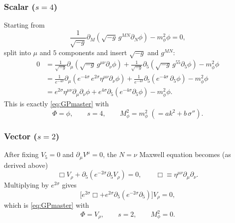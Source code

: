 \documentclass[11pt]{article}
\begin{document}
\subsubsection*{Scalar ($s=4$)}
Starting from
\[
\frac{1}{\sqrt{-g}}\partial_M\!\left(\sqrt{-g}\,g^{MN}\partial_N\phi\right)-m_\phi^2\phi=0,
\]
split into $\mu$ and $5$ components and insert $\sqrt{-g}$ and $g^{MN}$:
\begin{align}
0
&= \frac{1}{\sqrt{-g}}\partial_\mu\!\left(\sqrt{-g}\,g^{\mu\nu}\partial_\nu\phi\right)
+ \frac{1}{\sqrt{-g}}\partial_5\!\left(\sqrt{-g}\,g^{55}\partial_5\phi\right)
- m_\phi^2\phi \nonumber\\
&= \frac{1}{e^{-4\sigma}}\partial_\mu\!\left(e^{-4\sigma}\,e^{2\sigma}\eta^{\mu\nu}\partial_\nu\phi\right)
+ \frac{1}{e^{-4\sigma}}\partial_5\!\left(e^{-4\sigma}\,\partial_5\phi\right)
- m_\phi^2\phi \nonumber\\
&= e^{2\sigma}\eta^{\mu\nu}\partial_\mu\partial_\nu\phi
+ e^{4\sigma}\partial_5\!\left(e^{-4\sigma}\partial_5\phi\right)
- m_\phi^2\phi .
\end{align}
This is exactly \eqref{eq:GPmaster} with
\[
\Phi=\phi,\qquad s=4,\qquad M_\phi^2=m_\phi^2 \;(= ak^2+b\,\sigma'').
\]

\subsubsection*{Vector ($s=2$)}
After fixing $V_5=0$ and $\partial_\mu V^\mu=0$, the $N=\nu$ Maxwell equation becomes (as derived above)
\[
\Box V_\rho + \partial_5\!\left(e^{-2\sigma}\partial_5 V_\rho\right)=0,
\qquad \Box \equiv \eta^{\mu\nu}\partial_\mu\partial_\nu.
\]
Multiplying by $e^{2\sigma}$ gives
\[
\Big[e^{2\sigma}\Box + e^{2\sigma}\partial_5\!\left(e^{-2\sigma}\partial_5\right)\Big]V_\rho=0,
\]
which is \eqref{eq:GPmaster} with
\[
\Phi=V_\rho,\qquad s=2,\qquad M_\phi^2=0.
\]
\end{document}
